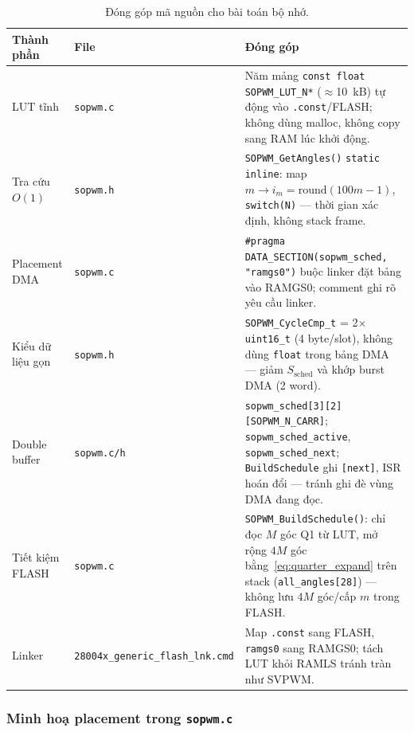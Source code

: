\begin{table}[htbp]
  \centering
  \caption{Đóng góp mã nguồn cho bài toán bộ nhớ.}
  \label{tab:code_contrib}
  \small
  \begin{tabular}{@{}p{3.2cm}p{4.2cm}p{5.8cm}@{}}
    \toprule
    Thành phần & File & Đóng góp \\
    \midrule
    LUT tĩnh &
    \texttt{sopwm.c} &
    Năm mảng \texttt{const float SOPWM\_LUT\_N*} ($\approx$\SI{10}{kB}) tự động vào \texttt{.const}/FLASH; không dùng malloc, không copy sang RAM lúc khởi động. \\
    \addlinespace
    Tra cứu $O(1)$ &
    \texttt{sopwm.h} &
    \texttt{SOPWM\_GetAngles()} \texttt{static inline}: map $m \rightarrow i_m=\mathrm{round}(100m-1)$, \texttt{switch(N)} --- thời gian xác định, không stack frame. \\
    \addlinespace
    Placement DMA &
    \texttt{sopwm.c} &
    \texttt{\#pragma DATA\_SECTION(sopwm\_sched, "ramgs0")} buộc linker đặt bảng vào RAMGS0; comment ghi rõ yêu cầu linker. \\
    \addlinespace
    Kiểu dữ liệu gọn &
    \texttt{sopwm.h} &
    \texttt{SOPWM\_CycleCmp\_t} = 2$\times$\texttt{uint16\_t} (4 byte/slot), không dùng \texttt{float} trong bảng DMA --- giảm $S_{\mathrm{sched}}$ và khớp burst DMA (2 word). \\
    \addlinespace
    Double buffer &
    \texttt{sopwm.c/h} &
    \texttt{sopwm\_sched[3][2][SOPWM\_N\_CARR]}; \texttt{sopwm\_sched\_active}, \texttt{sopwm\_sched\_next}; \texttt{BuildSchedule} ghi \texttt{[next]}, ISR hoán đổi --- tránh ghi đè vùng DMA đang đọc. \\
    \addlinespace
    Tiết kiệm FLASH &
    \texttt{sopwm.c} &
    \texttt{SOPWM\_BuildSchedule()}: chỉ đọc $M$ góc Q1 từ LUT, mở rộng $4M$ góc bằng~\eqref{eq:quarter_expand} trên stack (\texttt{all\_angles[28]}) --- không lưu $4M$ góc/cấp $m$ trong FLASH. \\
    \addlinespace
    Linker &
    \texttt{28004x\_generic\_flash\_lnk.cmd} &
    Map \texttt{.const} sang FLASH, \texttt{ramgs0} sang RAMGS0; tách LUT khỏi RAMLS tránh tràn như SVPWM. \\
    \bottomrule
  \end{tabular}
\end{table}

\subsubsection{Minh hoạ placement trong \texttt{sopwm.c}}

